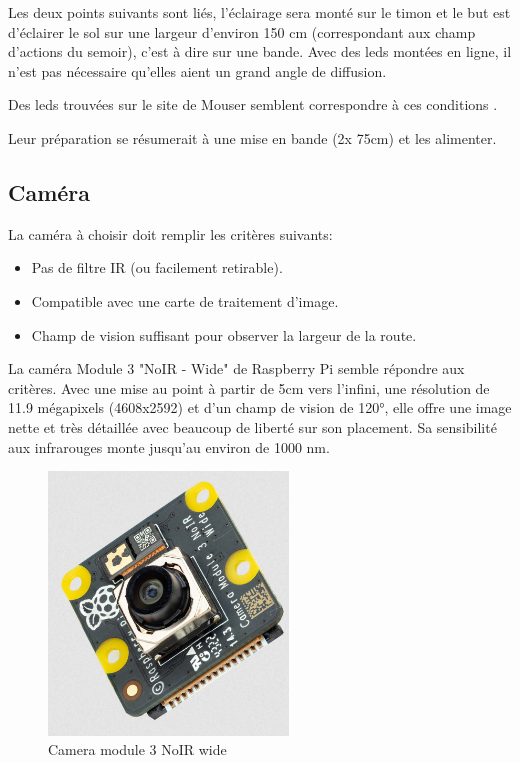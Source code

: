 Les deux points suivants sont liés, l'éclairage sera monté sur le timon et le but est d'éclairer le sol sur une largeur d'environ 150 \si{\centi\metre} (correspondant aux champ d'actions du semoir),
c'est à dire sur une bande. Avec des leds montées en ligne, il n'est pas nécessaire qu'elles aient un grand angle de diffusion.

Des leds trouvées sur le site de Mouser semblent correspondre à ces conditions \cite{ledIR}.

Leur préparation se résumerait à une mise en bande (2x 75\si{\centi\metre}) et les alimenter.


\subsection{Caméra}
La caméra à choisir doit remplir les critères suivants:
\begin{itemize}
    \item Pas de filtre IR (ou facilement retirable).
    \item Compatible avec une carte de traitement d'image.
    \item Champ de vision suffisant pour observer la largeur de la route.
\end{itemize}

La caméra Module 3 "NoIR - Wide" de Raspberry Pi \cite{camera} semble répondre aux critères. Avec une mise au point à partir de 5cm vers l'infini,
une résolution de 11.9 mégapixels (4608x2592) et d'un champ de vision de \ang{120}, elle offre une image nette et très détaillée avec beaucoup de liberté sur
son placement. Sa sensibilité aux infrarouges monte jusqu'au environ de 1000 \si{\nano\metre}.
\begin{figure}[H]
    \centering
    \includegraphics[height=7cm,angle=-90]{assets/figures/camera.png}
    \caption{Camera module 3 NoIR wide}
\end{figure}
\newpage
